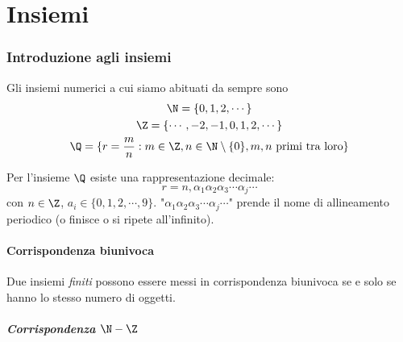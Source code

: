 \part{Insiemi}

\section{Introduzione agli insiemi}

Gli insiemi numerici a cui siamo abituati da sempre sono
\begin{gather*}
    \N=\{0, 1, 2, \cdots\}\\
    \Z=\{\cdots, -2, -1, 0, 1, 2, \cdots\}\\
    \Q=\{r=\frac{m}{n}:m \in \Z, n \in \N\setminus\{0\}, m,n \text{ primi tra loro}\}
\end{gather*}

Per l'insieme $ \Q $ esiste una rappresentazione decimale:
\[
    r=n,\alpha_1 \alpha_2 \alpha_3 \cdots\alpha_{j} \cdots
\]
con $ n \in \Z $, $ a_{i} \in\{0, 1, 2,\cdots,9\} $. "$ \alpha_1 \alpha_2 \alpha_3 \cdots\alpha_{j} \cdots $" prende il nome di allineamento periodico (o finisce o si ripete all'infinito).

\subsection{Corrispondenza biunivoca}

Due insiemi \textit{finiti} possono essere messi in corrispondenza biunivoca se e solo se hanno lo stesso numero di oggetti.

\subsubsection{Corrispondenza $ \N-\Z $}

\begin{center}
\end{center}

